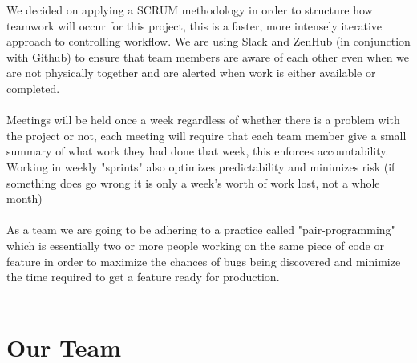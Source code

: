 \documentclass[12pt,a4paper]{article}
\begin{document}
\textnormal We decided on applying a SCRUM methodology in order to structure how teamwork will occur for
			this project, this is a faster, more intensely iterative approach to controlling workflow.
			We are using Slack and ZenHub (in conjunction with Github) to ensure that team members are aware of each other even when we are not physically together and are alerted when work is either available or completed.
			\\ \\
			Meetings will be held once a week regardless of whether there is a problem with
			the project or not, each meeting will require that each team member give a small summary
			of what work they had done that week, this enforces accountability. Working in weekly "sprints" also optimizes predictability and minimizes risk (if something does go wrong it is only a week's worth of work lost, not a whole month)
			\\ \\
			As a team we are going to be adhering to a practice called "pair-programming" which is essentially two or more people working on the same piece of code or feature in order to maximize the chances of bugs being discovered and minimize the time required to get a feature ready for production. 
			\\ \\ 

	\newpage
	\section{Our Team}
\end{document}
